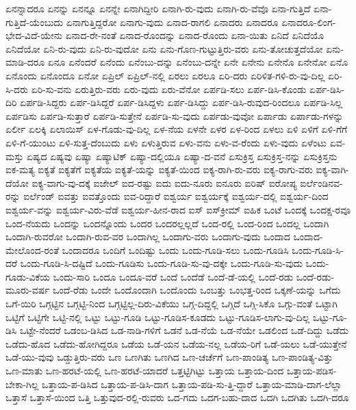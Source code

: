{ಏನನ್ನಾದರೂ
ಏನನ್ನು
ಏನನ್ನೂ
ಏನನ್ನೇ
ಏನಾಗಿದ್ದೀರಿ
ಏನಾಗಿ-ರು-ವುದು
ಏನಾಗಿ-ರು-ವೆವೊ
ಏನಾ-ಗುತ್ತಿದೆ
ಏನಾ-ಗುತ್ತಿದೆ-ಯೆಂಬುದು
ಏನಾಗುತ್ತಿದ್ದರೋ
ಏನಾಗು-ವುದು
ಏನಾದ-ರಾಗಲಿ
ಏನಾದರು
ಏನಾದರೂ
ಏನಾದರೂ-ಲಿಂಗ-ಭೇದ-ವಿದೆ-ಯೇನು
ಏನಾದ-ರೇ-ನಂತೆ
ಏನಾದ-ರೊಂದನ್ನು
ಏನಾದ-ರೊಂದು
ಏನಾ-ಯಿತು
ಏನಿದೆ
ಏನಿದೆಯೊ
ಏನಿದೆಯೋ
ಏನಿ-ರು-ವುದು
ಏನಿ-ರು-ವುದೋ
ಏನು
ಏನು-ಗೊಣ-ಗುಟ್ಟುತ್ತಿರು-ವರು
ಏನು-ತೋಚುತ್ತದೆಯೋ
ಏನು-ಮಾಡಿ-ದರೂ
ಏನೂ
ಏನೆಂದರೆ
ಏನೆಂದು
ಏನೆಂಬು-ದನ್ನು
ಏನೆಂಬು-ದನ್ನೇ
ಏನೇ
ಏನೇನು
ಏನೇನೊ
ಏನೇನೋ
ಏನೊ
ಏನೊಂದು
ಏನೊಂದೂ
ಏನೋ
ಏಪ್ರಿಲ್
ಏಪ್ರಿಲ್‌-ನಲ್ಲಿ
ಏರಲು
ಏರಲೂ
ಏರಿ-ದರು
ಏರಿಳಿತ-ಗಳಿ-ರು-ವು-ದಿಲ್ಲ
ಏರಿ-ಸಿ-ದರು
ಏರಿ-ಸು-ವನು
ಏರುತ್ತಿರು-ವರು
ಏರು-ವುದು
ಏರು-ವೆನೋ
ಏರ್ಪಡಿ-ಸಲು
ಏರ್ಪ-ಡಿಸಿ-ಕೊಂಡು
ಏರ್ಪ-ಡಿಸಿ-ದಿರಿ
ಏರ್ಪಡಿ-ಸಿದ್ದರು
ಏರ್ಪ-ಡಿಸಿದ್ದರೆ
ಏರ್ಪ-ಡಿಸಿದ್ದಳು
ಏರ್ಪ-ಡಿಸಿದ್ದು
ಏರ್ಪ-ಡಿಸಿ-ರುವುದ-ರಿಂದಲೂ
ಏರ್ಪಡಿ-ಸಿಲ್ಲ
ಏರ್ಪಡಿಸು
ಏರ್ಪಡಿ-ಸುತ್ತಾರೆ
ಏರ್ಪಡಿ-ಸುತ್ತೇನೆ
ಏರ್ಪಡಿ-ಸು-ವುದು
ಏರ್ಪಡು-ವುವೋ
ಏರ್ಪಾಡು
ಏರ್ಪಾಡು-ಗಳನ್ನು
ಏರ್ಲೀ
ಏಲಕ್ಕಿ
ಏಲಾಯಿಸ್
ಏಳ-ಗೊಡು-ವು-ದಿಲ್ಲ
ಏಳ-ನೆಯ
ಏಳನೇ
ಏಳರ
ಏಳ-ರಿಂದ
ಏಳಲು
ಏಳಿ
ಏಳಿಗೆ
ಏಳಿ-ಗೆಗೆ
ಏಳಿ-ಗೆ-ಯುಂಟು
ಏಳಿ-ಸುತ್ತ-ದೆಂಬುದು
ಏಳು
ಏಳುತ್ತಿರುವ
ಏಳು-ವನು
ಏಳು-ವ-ರೆಂದು
ಏಳು-ವುದು
ಏಳೆಂಟು
ಏವ-ಮಸ್ತು
ಏಷ್ಯದ
ಏಷ್ಯವು
ಏಷ್ಯಾ
ಏಷ್ಯಾಟಿಕ್
ಏಷ್ಯಾ-ದಲ್ಲಿಯೂ
ಏಷ್ಯಾ-ದ-ವನೆ
ಏಸುಕ್ರಿಸ್ತ
ಏಸುಕ್ರಿಸ್ತ-ನನ್ನು
ಏಸುಕ್ರಿಸ್ತನು
ಐಕ-ಮತ್ಯ
ಐಕ್ಯತೆ
ಐಕ್ಯತೆಗೆ
ಐಕ್ಯತೆಯ
ಐಕ್ಯತೆ-ಯನ್ನು
ಐಕ್ಯತೆ-ಯಿಂದ
ಐಕ್ಯ-ರಾಗಿ-ರು-ವರು
ಐಕ್ಯ-ರಾಗು-ವರು
ಐಕ್ಯ-ವಾಗಿ-ದೆಯೋ
ಐಕ್ಯ-ವಾಗು-ವು-ದಕ್ಕೆ
ಐಜೇಲ್
ಐದ-ರಷ್ಟು
ಐದು
ಐದು-ನೂರು
ಐನೂರು
ಐರಿಷ್
ಐರೋಪ್ಯ
ಐರ್ಲೆಂಡಿನವ-ರನ್ನು
ಐರ್ಲೆಂಡ್
ಐವತ್ತು
ಐವತ್ತೊಂದು
ಐವ-ರಿದ್ದಾರೆ
ಐಶ್ವರ್ಯ
ಐಶ್ವರ್ಯಕ್ಕೆ
ಐಶ್ವರ್ಯ-ದಲ್ಲಿ
ಐಶ್ವರ್ಯ-ದಿಂದ
ಐಶ್ವರ್ಯ-ವನ್ನು
ಐಶ್ವರ್ಯ-ವಿರು-ವೆಡೆ
ಐಶ್ವರ್ಯ-ಹೀನ-ರಾದ
ಐಸ್
ಐಸ್‌ಕ್ರೀಮ್
ಐಹಿಕ
ಒಂಟೆ
ಒಂದಕ್ಕೆ
ಒಂದಕ್ಷ-ರವೂ
ಒಂದ-ನೆಯದು
ಒಂದನ್ನು
ಒಂದನ್ನೊಂದು
ಒಂದರ
ಒಂದರಲ್ಲಲ್ಲದೆ
ಒಂದ-ರಲ್ಲಿ
ಒಂದ-ರಿಂದ
ಒಂದಲ್ಲ
ಒಂದಾಗಿ
ಒಂದಾಗಿ-ರುವರೋ
ಒಂದಾಗಿ-ರುವ-ವರ
ಒಂದಾಗಿಲ್ಲ
ಒಂದಾಗು-ವರು
ಒಂದಾಗು-ವುದು
ಒಂದಾದ
ಒಂದಾದ-ಮೇಲೊಂದ-ರಂತೆ
ಒಂದಾದರೂ
ಒಂದಿಗೆ
ಒಂದಿಷ್ಟು
ಒಂದು
ಒಂದು-ಗೂಡಿ-ಸಲು
ಒಂದು-ಗೂಡಿಸಿ
ಒಂದು-ಗೂಡಿ-ಸಿ-ದರೆ
ಒಂದು-ಗೂಡಿ-ಸಿ-ದಷ್ಟಿದೆ
ಒಂದು-ಗೂಡಿಸು
ಒಂದು-ಗೂಡಿ-ಸು-ವು-ದಕ್ಕೇ
ಒಂದು-ಗೂಡಿ-ಸು-ವುದು
ಒಂದು-ಗೂಡು-ವಿಕೆಯ
ಒಂದು-ಸಾರಿ
ಒಂದೂ
ಒಂದೂ-ವರೆ
ಒಂದೆ
ಒಂದೆಡೆ
ಒಂದೆ-ಡೆ-ಯಲ್ಲಿ
ಒಂದೆ-ರಡು
ಒಂದೆ-ರಡು-ಮೂರು-ವರ್ಷ
ಒಂದೆ-ರೆಡು
ಒಂದೇ
ಒಂದೊಂದಾಗಿ
ಒಂದೊಂದು
ಒಂಬತ್ತು
ಒಂಭತ್ತ-ರಿಂದ
ಒಕ್ಕಣೆ-ಯನ್ನು
ಒಗೆದು
ಒಗೆ-ಯಿರಿ
ಒಗ್ಗಟ್ಟಿನ
ಒಗ್ಗಟ್ಟಿ-ನಿಂದ
ಒಗ್ಗಟ್ಟಿಲ್ಲ-ದಿರು-ವಿಕೆಯು
ಒಗ್ಗ-ದಿದ್ದಲ್ಲಿ
ಒಗ್ಗಿದೆ
ಒಗ್ಗಿ-ಸಿಕೊ
ಒಗ್ಗು-ವಂತೆ
ಒಟ್ಟಾಗಿ
ಒಟ್ಟಿಗೆ
ಒಟ್ಟಿಗೇ
ಒಟ್ಟಿ-ನಲ್ಲಿ
ಒಟ್ಟು
ಒಟ್ಟು-ಗೂಡಿ
ಒಟ್ಟು-ಗೂಡಿಸ-ಕೂಡದು
ಒಟ್ಟು-ಗೂಡಿಸ-ಲಾಗು-ವು-ದಿಲ್ಲ
ಒಟ್ಟು-ಗೂ-ಡಿಸಿ
ಒಟ್ಟೇ-ನೆಂದರೆ
ಒಡಂಬ-ಡಿಸಿದ
ಒಡ-ನಾಡಿ-ಗಳಿಗೆ
ಒಡನೆ
ಒಡ-ನೆಯೆ
ಒಡ-ನೆಯೇ
ಒಡಲಿಂದ
ಒಡೆ-ದಿದ್ದು
ಒಡೆದು
ಒಡೆದು-ಹೊದ
ಒಡೆದು-ಹೋಗಿದ್ದರೂ
ಒಡೆಯ
ಒಡೆ-ಯನ
ಒಡೆಯ-ನಲ್ಲ
ಒಡೆಯ-ರಿಗೆ
ಒಡೆ-ಯಲು
ಒಡೆ-ಯುತ್ತೇನೆ
ಒಡೆ-ಯು-ವುವು
ಒಡ್ಡುತ್ತಿರು-ವರು
ಒಣ
ಒಣಗಿತು
ಒಣಗಿದ
ಒಣ-ಚರ್ಚೆಗೆ
ಒಣ-ಪಾಂಡಿತ್ಯ
ಒಣ-ಪಾಂಡಿತ್ಯ-ವಿತ್ತು
ಒಣ-ಮಾತು
ಒಣ-ಹರಟೆ-ಯಲ್ಲಿ
ಒಣ-ಹರಟೆ-ಯಾದರೆ
ಒತ್ತಟ್ಟಿಗಿಟ್ಟು
ಒತ್ತಾಯ
ಒತ್ತಾಯ-ದಿಂದ
ಒತ್ತಾಯ-ಪಡಿಸ-ಬೇಕಾ-ಗಿಲ್ಲ
ಒತ್ತಾಯ-ಪ-ಡಿಸಿದ
ಒತ್ತಾಯ-ಪ-ಡಿಸಿ-ದಾಗ
ಒತ್ತಾಯ-ಪಡಿ-ಸು-ತ್ತಿ-ದ್ದಾರೆ
ಒತ್ತಾಯ-ಮಾಡಿ-ದಾಗ-ಲೆಲ್ಲಾ
ಒತ್ತಾಸೆ
ಒತ್ತಾಸೆ-ಯಿಂದ
ಒತ್ತಿ
ಒತ್ತುವುದ-ರಲ್ಲಿ-ರುವರು
ಒದ-ಗದು
ಒದಗ-ಬಹು-ದಾದ
ಒದಗಿ
ಒದಗಿತು
ಒದಗಿ-ದರೂ
}
